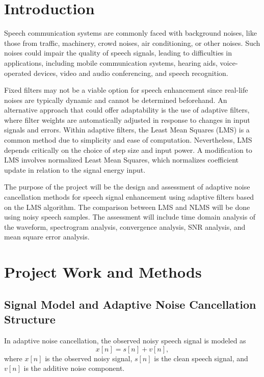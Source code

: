 \documentclass[12pt]{article}
\begin{document}
\section{Introduction}

Speech communication systems are commonly faced with background noises, like those from traffic, machinery, crowd noises, air conditioning, or other noises. Such noises could impair the quality of speech signals, leading to difficulties in applications, including mobile communication systems, hearing aids, voice-operated devices, video and audio conferencing, and speech recognition.

Fixed filters may not be a viable option for speech enhancement since real-life noises are typically dynamic and cannot be determined beforehand. An alternative approach that could offer adaptability is the use of adaptive filters, where filter weights are automatically adjusted in response to changes in input signals and errors. Within adaptive filters, the Least Mean Squares (LMS) is a common method due to simplicity and ease of computation. Nevertheless, LMS depends critically on the choice of step size and input power. A modification to LMS involves normalized Least Mean Squares, which normalizes coefficient update in relation to the signal energy input.

The purpose of the project will be the design and assessment of adaptive noise cancellation methods for speech signal enhancement using adaptive filters based on the LMS algorithm. The comparison between LMS and NLMS will be done using noisy speech samples. The assessment will include time domain analysis of the waveform, spectrogram analysis, convergence analysis, SNR analysis, and mean square error analysis.

\section{Project Work and Methods}
\subsection{Signal Model and Adaptive Noise Cancellation Structure}

In adaptive noise cancellation, the observed noisy speech signal is modeled as
\begin{equation}
x[n] = s[n] + v[n],
\end{equation}
where $x[n]$ is the observed noisy signal, $s[n]$ is the clean speech signal, and $v[n]$ is the additive noise component.
\end{document}
